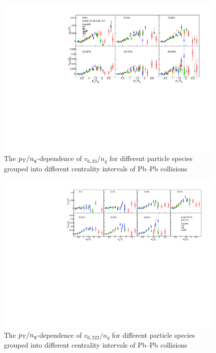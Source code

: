\begin{figure}[!htb]
\begin{center}
\includegraphics[scale=0.62]{figures/scaling/All_v633_gap00_NCQ.pdf}
\end{center}
\caption{The $p_{\rm{T}}/n_{q}$-dependence of $v_{6,33}/n_{q}$ for different particle species grouped into different centrality intervals of Pb--Pb collisions \sNN}
\label{v633_NCQ}
\end{figure}

\begin{figure}[!htb]
\begin{center}
\includegraphics[scale=0.82]{figures/scaling/All_v6222_gap00_NCQ.pdf}
\end{center}
\caption{The $p_{\rm{T}}/n_{q}$-dependence of $v_{6,222}/n_{q}$ for different particle species grouped into different centrality intervals of Pb--Pb collisions \sNN}
\label{v6222_NCQ}
\end{figure}

